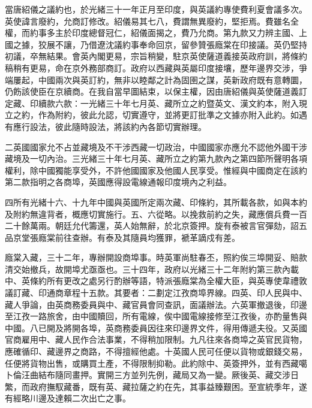 \begin{pinyinscope}
當唐紹儀之議約也，於光緒三十一年正月至印度，與英議約專使費利夏會議多次。英使諱言廢約，允商訂修改。紹儀易其七八，費謂無異廢約，堅拒焉。費雖名全權，而約事多主於印度總督冠仁，紹儀面揭之，費乃允商。第九款又力辨主國、上國之據，狡展不讓，乃借遼沈議約事奉命回京，留參贊張廕棠在印接議。英仍堅持初議，卒無結果。會英內閣更易，宗旨稍變，駐京英使薩道義接英政府訓，將條約稿稍有更易，命在京外務部商訂。政府以西藏與英屬印度接壤，歷年邊界交涉，爭端屢起，中國兩次與英訂約，無非以睦鄰之計為固圉之謀，英新政府既有意轉圜，仍飭該使臣在京續商。在我自當早圖結束，以保主權，因由唐紹儀與英使薩道義訂定藏、印續款六款：一光緒三十年七月英、藏所立之約暨英文、漢文約本，附入現立之約，作為附約，彼此允認，切實遵守，並將更訂批準之文據亦附入此約。如遇有應行設法，彼此隨時設法，將該約內各節切實辦理。

二英國國家允不占並藏境及不干涉西藏一切政治，中國國家亦應允不認他外國干涉藏境及一切內治。三光緒三十年七月英、藏所立之約第九款內之第四節所聲明各項權利，除中國獨能享受外，不許他國國家及他國人民享受。惟經與中國商定在該約第二款指明之各商埠，英國應得設電線通報印度境內之利益。

四所有光緒十六、十九年中國與英國所定兩次藏、印條約，其所載各款，如與本約及附約無違背者，概應切實施行。五、六從略。以挽救前約之失，藏應償兵費一百二十餘萬兩。朝廷允代籌還，英人始無辭，於北京簽押。旋有泰被言官彈劾，詔五品京堂張廕棠前往查辦。有泰及其隨員均獲罪，褫革謫戍有差。

廕棠入藏，三十二年，專辦開設商埠事。時英軍尚駐春丕，照約俟三埠開妥、賠款清交始撤兵，故開埠尤亟亟也。三十四年，政府以光緒三十二年附約第三款內載中、英條約所有更改之處另行酌辦等語，特派張廕棠為全權大臣，與英專使韋禮敦議訂藏、印通商章程十五款。其要者：二劃定江孜商埠界線。四英、印人民與中、藏人爭論，由英商務委員與中、藏官員會同查訊，面議辦法。六英軍撤退後，印邊至江孜一路旅舍，由中國贖回，所有電線，俟中國電線接修至江孜後，亦酌量售與中國。八已開及將開各埠，英商務委員因往來印邊界文件，得用傳遞夫役。又英國官商雇用中、藏人民作合法事業，不得稍加限制。九凡往來各商埠之英官民貨物，應確循印、藏邊界之商路，不得擅經他處。十英國人民可任便以貨物或銀錢交易，任便將貨物出售，或購買土產，不得限制抑勒。此約除中、英簽押外，並有西藏噶卜倫汪曲結布隨同畫押。實開三方並列先例，藏局又為一變。厥後英、藏交涉日繁，而政府撫馭藏番，既有英、藏拉薩之約在先，其事益臻艱困。至宣統季年，遂有經略川邊及達賴二次出亡之事。


\end{pinyinscope}
